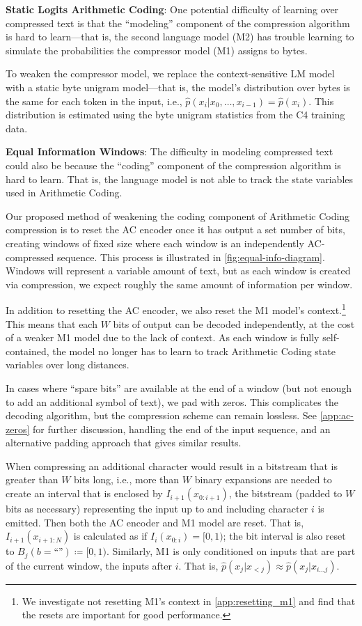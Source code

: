 \textbf{Static Logits Arithmetic Coding}: One potential difficulty of learning over compressed text is that the ``modeling'' component of the compression algorithm is hard to learn---that is, the second language model (M2) has trouble learning to simulate the probabilities the compressor model (M1) assigns to bytes.

To weaken the compressor model, we replace the context-sensitive LM model with a static byte unigram model---that is, the model's distribution over bytes is the same for each token in the input, i.e., $\hat{p}(x_i | x_0, \dots, x_{i-1}) = \hat{p}(x_i)$. This distribution is estimated using the byte unigram statistics from the C4 training data.

\textbf{Equal Information Windows}: The difficulty in modeling compressed text could also be because the ``coding'' component of the compression algorithm is hard to learn. That is, the language model is not able to track the state variables used in Arithmetic Coding.

Our proposed method of weakening the coding component of Arithmetic Coding compression is to reset the AC encoder once it has output a set number of bits, creating windows of fixed size where each window is an independently AC-compressed sequence. This process is illustrated in \ref{fig:equal-info-diagram}. Windows will represent a variable amount of text, but as each window is created via compression, we expect roughly the same amount of information per window.

In addition to resetting the AC encoder, we also reset the M1 model's context.\footnote{We investigate not resetting M1's context in \ref{app:resetting_m1} and find that the resets are important for good performance.} This means that each $W$ bits of output can be decoded independently, at the cost of a weaker M1 model due to the lack of context. As each window is fully self-contained, the model no longer has to learn to track Arithmetic Coding state variables over long distances.

In cases where ``spare bits'' are available at the end of a window (but not enough to add an additional symbol of text), we pad with zeros. This complicates the decoding algorithm, but the compression scheme can remain lossless. See \ref{app:ac-zeros} for further discussion, handling the end of the input sequence, and an alternative padding approach that gives similar results.

When compressing an additional character would result in a bitstream that is greater than $W$ bits long, i.e., more than $W$ binary expansions are needed to create an interval that is enclosed by $I_{i + 1}(x_{0:i+1})$, the bitstream (padded to $W$ bits as necessary) representing the input up to and including character $i$ is emitted. Then both the AC encoder and M1 model are reset. That is, $I_{i + 1}(x_{i+1:N})$ is calculated as if $I_i(x_{0:i}) = [0, 1)$; the bit interval is also reset to $B_j(b=\text{``''}) \coloneqq [0, 1)$. Similarly, M1 is only conditioned on inputs that are part of the current window, the inputs after $i$. That is, $\hat{p}(x_j | x_{<j}) \approx \hat{p}(x_j | x_{i \dots j})$.


